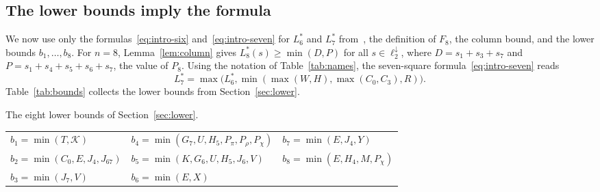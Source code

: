 \documentclass[12pt]{amsart}
\theoremstyle{definition}
\theoremstyle{remark}
\numberwithin{equation}{section}
\numberwithin{figure}{section}
\numberwithin{table}{section}
\newcommand{\F}{F_8}
\newcommand{\KK}{\mathcal K}
\newcommand{\Ppi}{P_\pi}
\newcommand{\Prho}{P_\rho}
\newcommand{\Pchi}{P_\chi}
\begin{document}
\subsection{The lower bounds imply the formula}\label{sec:combine}
We now use only the formulas~\eqref{eq:intro-six} and~\eqref{eq:intro-seven}
for $L_6^*$ and $L_7^*$ from~\cite[Theorems~3.8 and~5.5]{BadgerSeven},
the definition of $\F$, the column bound, and the lower bounds
$b_1,\ldots,b_8$. For $n=8$, Lemma~\ref{lem:column} gives
$L_8^*(s)\ge\min(D,P)$ for all $s\in\ell_2^\downarrow$, where $D=s_1+s_3+s_7$ and $P=s_1+s_4+s_5+s_6+s_7$, the value of $P_8$.
Using the notation of Table~\ref{tab:names}, the seven-square
formula~\eqref{eq:intro-seven} reads
\begin{equation}\label{eq:L7}
L_7^*=\max\bigl(L_6^*,\min(\max(W,H),\max(C_0,C_3),R)\bigr).
\end{equation}
Table~\ref{tab:bounds} collects the lower bounds from
Section~\ref{sec:lower}.

\begin{center}
\captionsetup{type=table}
\small
\renewcommand{\arraystretch}{1.12}
\caption{The eight lower bounds of Section~\ref{sec:lower}.}\label{tab:bounds}
\begin{tabular}{@{}l@{\qquad}l@{\qquad}l@{}}
\toprule
$b_1=\min(T,\KK)$ & $b_4=\min(G_7,U,H_5,\Ppi,\Prho,\Pchi)$ & $b_7=\min(E,J_4,Y)$\\
$b_2=\min(C_0,E,J_4,J_{67})$ & $b_5=\min(K,G_6,U,H_5,J_6,V)$ & $b_8=\min(E,H_4,M,\Pchi)$\\
$b_3=\min(J_7,V)$ & $b_6=\min(E,X)$ & \\
\bottomrule
\end{tabular}
\end{center}
\end{document}
